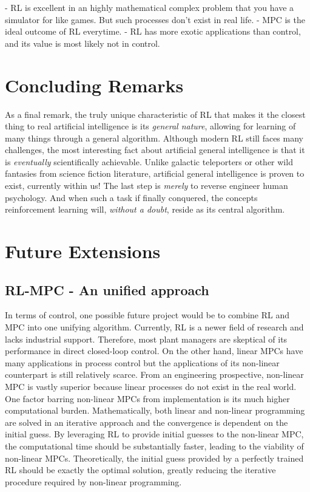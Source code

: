 - RL is excellent in an highly mathematical complex problem that you have a simulator for like games.  But such processes don't exist in real life.
- MPC is the ideal outcome of RL everytime.
- RL has more exotic applications than control, and its value is most likely not in control.

\section{Concluding Remarks}











As a final remark, the truly unique characteristic of RL that makes it the closest thing to real artificial intelligence is its \textit{general nature}, allowing for learning of many things through a general algorithm. Although modern RL still faces many challenges, the most interesting fact about artificial general intelligence is that it is \textit{eventually} scientifically achievable. Unlike galactic teleporters or other wild fantasies from science fiction literature, artificial general intelligence is proven to exist, currently within us!  The last step is \textit{merely} to reverse engineer human psychology. And when such a task if finally conquered, the concepts reinforcement learning will, \textit{without a doubt}, reside as its central algorithm.

\section{Future Extensions}
\subsection{RL-MPC - An unified approach}
In terms of control, one possible future project would be to combine RL and MPC into one unifying algorithm.  Currently, RL is a newer field of research and lacks industrial support. Therefore, most plant managers are skeptical of its performance in direct closed-loop control. On the other hand, linear MPCs have many applications in process control but the applications of its non-linear counterpart is still relatively scarce. From an engineering prospective, non-linear MPC is vastly superior because linear processes do not exist in the real world. One factor barring non-linear MPCs from implementation is its much higher computational burden. Mathematically, both linear and non-linear programming are solved in an iterative approach and the convergence is dependent on the initial guess.  By leveraging RL to provide initial guesses to the non-linear MPC, the computational time should be substantially faster, leading to the viability of non-linear MPCs. Theoretically, the initial guess provided by a perfectly trained RL should be exactly the optimal solution, greatly reducing the iterative procedure required by non-linear programming.  

